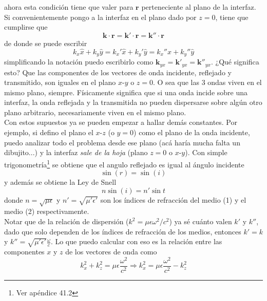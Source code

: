 ahora esta condición tiene que valer para $\textbf{r}$ perteneciente al plano de la interfaz. Si convenientemente pongo a la interfaz en el plano dado por $z = 0$, tiene que cumplirse que 
\begin{equation*}
    \textbf{k}\cdot\textbf{r} = 
    \textbf{k}'\cdot\textbf{r} = 
    \textbf{k}''\cdot\textbf{r}
\end{equation*}
de donde se puede escribir
\begin{equation*}
    k_{x}\hat{x} + k_{y}\hat{y} =
    k_{x}'\hat{x} + k_{y}'\hat{y} =
    k_{x}''\hat{x} + k_{y}''\hat{y}
\end{equation*}
simplificando la notación puedo escribirlo como $\textbf{k}_{yx} = \textbf{k}'_{yx} = \textbf{k}''_{yx}$. ¿Qué significa esto? Que las componentes de los vectores de onda incidente, reflejado y transmitido, son iguales en el plano $x$-$y$ o $z = 0$. O sea que las 3 ondas viven en el mismo plano, siempre. Físicamente significa que si una onda incide sobre una interfaz, la onda reflejada y la transmitida no pueden dispersarse sobre algún otro plano arbitrario, necesariamente viven en el mismo plano.\\
\indent Con estos supuestos ya se pueden empezar a hallar demás constantes. Por ejemplo, si defino el plano el $x$-$z$ (o $y = 0$) como el plano de la onda incidente, puedo analizar todo el problema desde ese plano (acá haría mucha falta un dibujito...) y la interfaz \textit{sale de la hoja} (plano $z = 0$ o $x$-$y$). Con simple trigonometría\footnote{Ver apéndice 41.2} se obtiene que el angulo reflejado es igual al ángulo incidente
\begin{equation*}
    \sin{(r)} = \sin{(i)}
\end{equation*}
y además se obtiene la Ley de Snell
\begin{equation*}
    n\sin{(i)} = n'\sin{t}
\end{equation*}
donde $n = \sqrt{\mu\epsilon}$ y $n' = \sqrt{\mu'\epsilon'}$ son los índices de refracción del medio (1) y el medio (2) respectivamente.\\
\indent Notar que de la relación de dispersión ($k^{2} = \mu\epsilon \omega^{2}/c^{2}$) ya sé cuánto valen $k'$ y $k''$, dado que solo dependen de los índices de refracción de los medios, entonces $k' = k$ y $k'' = \sqrt{\mu'\epsilon'}\frac{\omega}{c}$. Lo que puedo calcular con eso es la relación entre las componentes $x$ y $z$ de los vectores de onda como
\begin{equation*}
    k_{x}^{2} + k_{z}^{2} = \mu\epsilon\frac{\omega^{2}}{c^{2}}
    \Longrightarrow
    k_{x}^{2} = \mu\epsilon\frac{\omega^{2}}{c^{2}} - k_{z}^{2}
\end{equation*}
